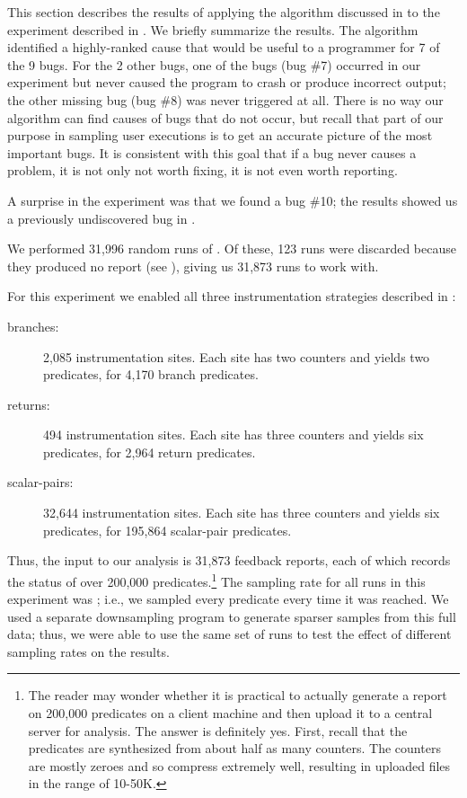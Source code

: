This section describes the results of applying the algorithm discussed
in  to the experiment described in
.  We briefly summarize the results.
The algorithm identified a highly-ranked cause that would be useful to a programmer
for 7 of the 9 bugs.  For the 2 other bugs,
one of the bugs (bug \#7) occurred in our experiment but never caused
the program to crash or produce incorrect output; the other missing bug (bug \#8) was never
triggered at all.  There is no way our algorithm can find causes of bugs that do not
occur, but recall that part of our purpose in sampling user executions
is to get an accurate picture of the most important bugs. It is consistent with
this goal that if a bug never causes a problem, it is not only not worth fixing,
it is not even worth reporting.

A surprise in the experiment was that we found a bug \#10; the results
showed us a previously undiscovered bug in \moss.

We performed 31,996 random runs of \moss.  Of these, 123 runs were
discarded because they produced no report (see
), giving us 31,873 runs to work with.

For this experiment we enabled all three instrumentation strategies
described in :

\begin{description}
\item[branches:] 2,085 instrumentation sites.  Each site has two
  counters and yields two predicates, for 4,170 branch predicates.

\item[returns:] 494 instrumentation sites.  Each site has three
  counters and yields six predicates, for 2,964 return predicates.

\item[scalar-pairs:] 32,644 instrumentation sites.  Each site has
  three counters and yields six predicates, for 195,864 scalar-pair
  predicates.
\end{description}

Thus, the input to our analysis is 31,873 feedback reports, each of
which records the status of over 200,000 predicates.\footnote{The
reader may wonder whether it is practical to actually generate a
report on 200,000 predicates on a client machine and then upload it to
a central server for analysis.  The answer is definitely yes.  First,
recall that the predicates are synthesized from about half as many
counters.  The counters are mostly zeroes and so compress extremely
well, resulting in uploaded files in the range of 10-50K.}  The
sampling rate for all runs in this experiment was ;
i.e., we sampled every predicate every time it was reached.  We used a
separate downsampling program to generate sparser samples from this
full data; thus, we were able to use the same set of runs to test the
effect of different sampling rates on the results.

